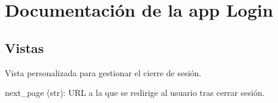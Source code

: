 \documentclass[letterpaper,10pt,spanish]{sphinxmanual}
\begin{document}
\sphinxstepscope


\chapter{Documentación de la app Login}
\label{\detokenize{login:documentacion-de-la-app-login}}\label{\detokenize{login::doc}}

\section{Vistas}
\label{\detokenize{login:vistas}}

\begin{fulllineitems}

\pysigstartsignatures
{}
\pysigstopsignatures
\sphinxAtStartPar
Vista personalizada para gestionar el cierre de sesión.
\begin{description}
\sphinxAtStartPar
next\_page (str): URL a la que se redirige al usuario tras cerrar sesión.

\end{description}


\begin{fulllineitems}

\pysigstartsignatures
{}
\pysigstopsignatures
\end{fulllineitems}


\end{fulllineitems}
\end{document}
